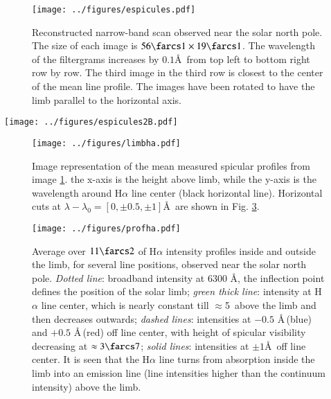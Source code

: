 \begin{figure}
\center \texttt{[image: ../figures/espicules.pdf]} 
\caption{Reconstructed narrow-band scan observed near the solar north pole. The size of each image is $56\farcs1\times19\farcs1$. The wavelength of the filtergrams increases by $0.1$\AA\, from top left to bottom right row by row. The third image in the third row is closest to the center of the mean line profile. The images have been rotated to have the limb parallel to the horizontal axis.}  
\label{fig:spicules}
\end{figure}
\begin{sidewaysfigure}
\center \texttt{[image: ../figures/espicules2B.pdf]} 
\caption{Limb H$\alpha$ 2D filtergram at $\lambda_{0} +1.1$ \AA\, near the south pole, where a coronal hole was present. This region shows much stronger emission and more variation of spicule width, height and inclination as Fig. \ref{fig:spicules}. A background of thin vertical spicules can be seen overlaid with wider and more inclined spicules, including nearly horizontal jets. Some of the spicules appear to be bent and show internal structure such as splitting into parallel jets. The maximum projected height above the limb is $\approx 8\,250$~km, while the mean height at this wavelength is $\approx$3700 km. The image has been rotated to show a horizontal limb in the presentation.}  
\label{fig:spicules2}
\end{sidewaysfigure}
\begin{figure}
\center 
\texttt{[image: ../figures/limbha.pdf]} 
\caption{Image representation of the mean measured spicular profiles from image \ref{fig:spicules}. the x-axis is the height above limb, while the y-axis is the wavelength around H$\alpha$ line center (black horizontal line). Horizontal cuts at $\lambda-\lambda_{0}=[0,\pm 0.5, \pm 1]$\AA\, are shown in Fig. \ref{fig:spiprof}.} 
\label{fig:spiprofima}
\end{figure}

\begin{figure}
\center \texttt{[image: ../figures/profha.pdf]} 
\caption{Average over $11\farcs2$ of H$\alpha$ intensity profiles inside and outside the limb, for several line positions, observed near the solar north pole. \emph{Dotted line}: broadband intensity at 6300 \AA, the inflection point defines the position of the solar limb; \emph{green thick line}: intensity at H$\alpha$ line center, which is nearly constant till $\approx$5\arcsec\ above the limb and then decreases outwards; \emph{dashed lines}: intensities at $-0.5$ \AA\,(blue) and $+0.5$ \AA\,(red) off line center, with height of spicular visibility decreasing at $\approx3\farcs7$; \emph{solid lines}: intensities at $\pm1$\AA\, off line center. It is seen that the H$\alpha$ line turns from absorption inside the limb into an emission line (line intensities higher than the continuum intensity) above the limb.}  
\label{fig:spiprof}
\end{figure}




